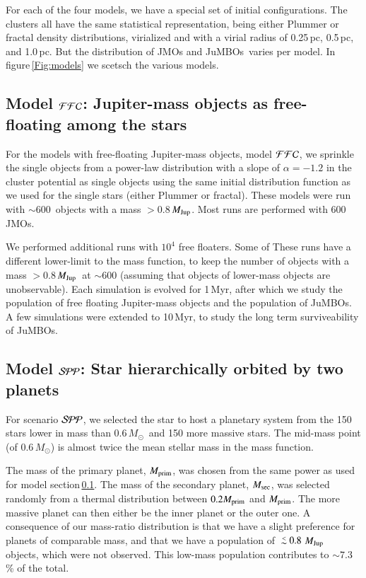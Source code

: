 \documentclass[submission,phys]{lib/SciPost}
\newcommand{\MSun}{\mbox{${M}_\odot$}}
\newcommand{\MJup}{\mbox{${M}_{\rm Jup}$}}
\def\aplt{\ {\raise-.5ex\hbox{$\buildrel<\over\sim$}}\ }
\newcommand{\jumbos}{\mbox{JuMBOs}}
\begin{document}
For each of the four models, we have a special set of initial
configurations. The clusters all have the same statistical
representation, being either Plummer or fractal density distributions,
virialized and with a virial radius of 0.25\,pc, 0.5\,pc, and
1.0\,pc. But the distribution of JMOs and \jumbos\, varies per model.
In figure\,\ref{Fig:models} we scetsch the various models.

\subsection{Model ${\cal FFC}$: Jupiter-mass objects as free-floating among the stars}\label{Sect:FFC}

For the models with free-floating Jupiter-mass objects, model ${\cal
  FFC}$, we sprinkle the single objects from a power-law distribution
with a slope of $\alpha = -1.2$ in the cluster potential as single
objects using the same initial distribution function as we used for
the single stars (either Plummer or fractal).  These models were run
with $\sim 600$\, objects with a mass $>0.8$\,\MJup. Most runs are
performed with 600 JMOs.

We performed additional runs with $10^4$ free floaters. Some of These
runs have a different lower-limit to the mass function, to keep the
number of objects with a mass $>0.8$\,\MJup\, at $\sim 600$ (assuming
that objects of lower-mass objects are unobservable).  Each simulation
is evolved for 1\,Myr, after which we study the population of free
floating Jupiter-mass objects and the population of \jumbos. A few
simulations were extended to 10\,Myr, to study the long term
surviveability of \jumbos.

\subsection{Model ${\cal SPP}$: Star hierarchically orbited by two planets}

For scenario ${\cal SPP}$, we selected the star to host a
planetary system from the 150 stars lower in mass than 0.6\,\MSun\,
and 150 more massive stars. The mid-mass point (of 0.6\,\MSun) is
almost twice the mean stellar mass in the mass function.

The mass of the primary planet, $M_{\rm prim}$, was chosen from the
same power as used for model section\,\ref{Sect:FFC}.  The mass of the
secondary planet, $M_{\rm sec}$, was selected randomly from a thermal
distribution between $0.2 M_{\rm prim}$ and $M_{\rm prim}$.  The more
massive planet can then either be the inner planet or the outer one.
A consequence of our mass-ratio distribution is that we have a slight
preference for planets of comparable mass, and that we have a
population of $\aplt 0.8$\,\MJup\, objects, which were not observed.
This low-mass population contributes to $\sim 7.3$\,\% of the total.
\end{document}

